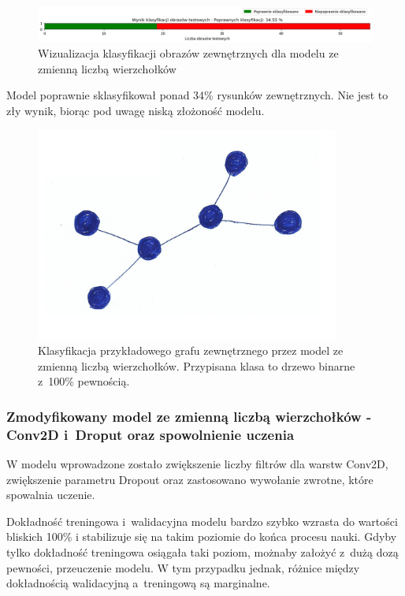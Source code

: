 \begin{figure}[ht]
	\centering
	\includegraphics[width=14cm]{resources/tests/images/v3/multiple_edges_bar.png}
	\caption{Wizualizacja klasyfikacji obrazów zewnętrznych dla modelu ze zmienną liczbą wierzchołków}
	\label{Fig:tests-var-0c}
\end{figure}
\FloatBarrier

Model poprawnie sklasyfikował ponad 34\% rysunków zewnętrznych.
Nie jest to zły wynik, biorąc pod uwagę niską złożoność modelu.

\begin{figure}[ht]
	\centering
	\includegraphics[width=10cm]{../graph_classification/test_graphs/drawn/tree-binary-1.png}
	\caption{Klasyfikacja przykładowego grafu zewnętrznego przez model ze zmienną liczbą wierzchołków.
		Przypisana klasa to drzewo binarne z~100\% pewnością.}
	\label{Fig:tests-var-0d}
\end{figure}
\FloatBarrier

\subsubsection{Zmodyfikowany model ze zmienną liczbą wierzchołków - Conv2D i~Droput oraz spowolnienie uczenia}

W modelu wprowadzone zostało zwiększenie liczby filtrów dla warstw Conv2D, zwiększenie parametru Dropout
oraz zastosowano wywołanie zwrotne, które spowalnia uczenie.

Dokładność treningowa i~walidacyjna modelu bardzo szybko wzrasta do wartości bliskich 100\%
i stabilizuje się na takim poziomie do końca procesu nauki.
Gdyby tylko dokładność treningowa osiągała taki poziom, możnaby założyć z~dużą dozą pewności, przeuczenie modelu.
W tym przypadku jednak, różnice między dokładnością walidacyjną a~treningową są marginalne.

